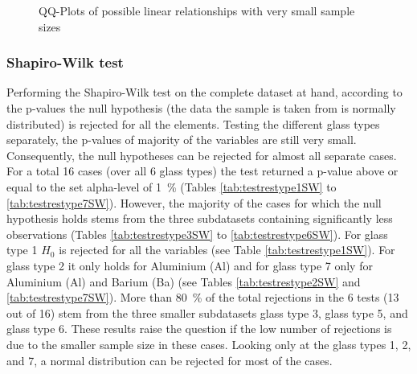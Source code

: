 \documentclass[a4paper, 12pt, titlepage, headsepline, listof = totoc, bibliography = totoc, numbers = noenddot]{scrartcl}
\begin{document}
\begin{figure}[h!]
\begin{subfigure}{.5\textwidth}
  \vspace{-1cm}
  \caption{}
  \label{fig:QQsampleslin2b}
\end{subfigure}
\caption{QQ-Plots of possible linear relationships with very small sample sizes}
\label{fig:QQsampleslin2}
\end{figure}

\subsubsection{Shapiro-Wilk test}\label{sec:shapiro-original}
Performing the Shapiro-Wilk test on the complete dataset at hand, according to the p-values the null hypothesis (the data the sample is taken from is normally distributed) is rejected for all the elements.
Testing the different glass types separately, the p-values of majority of the variables are still very small. Consequently, the null hypotheses can be rejected for almost all separate cases. For a total 16 cases (over all 6 glass types) the test returned a p-value above or equal to the set alpha-level of 1\, \% (Tables \ref{tab:testrestype1SW} to \ref{tab:testrestype7SW}). However, the majority of the cases for which the null hypothesis holds stems from the three subdatasets containing significantly less observations (Tables \ref{tab:testrestype3SW} to \ref{tab:testrestype6SW}). For glass type 1 $H_0$ is rejected for all the variables (see Table \ref{tab:testrestype1SW}). For glass type 2 it only holds for Aluminium (Al) and for glass type 7 only for Aluminium (Al) and Barium (Ba) (see Tables \ref{tab:testrestype2SW} and \ref{tab:testrestype7SW}).
More than 80\, \% of the total rejections in the 6 tests (13 out of 16) stem from the three smaller subdatasets glass type 3, glass type 5, and glass type 6. These results raise the question if the low number of rejections is due to the smaller sample size in these cases. Looking only at the glass types 1, 2, and 7, a normal distribution can be rejected for most of the cases.
\end{document}
